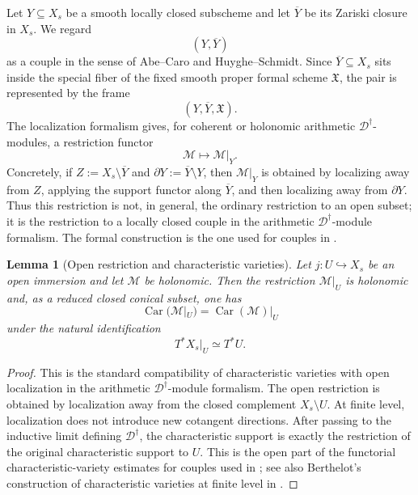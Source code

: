 \documentclass[11pt]{amsart}
\theoremstyle{plain}
\newtheorem{lemma}{Lemma}[section]
\theoremstyle{definition}
\theoremstyle{remark}
\newcommand{\Car}{\operatorname{Car}}
\begin{document}
Let \(Y\subseteq X_s\) be a smooth locally closed subscheme and let
\(\overline Y\) be its Zariski closure in \(X_s\). We regard
\[
  (Y,\overline Y)
\]
as a couple in the sense of Abe--Caro and Huyghe--Schmidt. Since
\(\overline Y\subseteq X_s\) sits inside the special fiber of the fixed smooth
proper formal scheme \(\mathfrak X\), the pair is represented by the frame
\[
  (Y,\overline Y,\mathfrak X).
\]
The localization formalism gives, for coherent or holonomic arithmetic
\(\mathscr D^\dagger\)-modules, a restriction functor
\[
  \mathcal M\longmapsto \mathcal M|_Y.
\]
Concretely, if \(Z:=X_s\setminus\overline Y\) and
\(\partial Y:=\overline Y\setminus Y\), then \(\mathcal M|_Y\) is obtained by
localizing away from \(Z\), applying the support functor along \(\overline Y\),
and then localizing away from \(\partial Y\). Thus this restriction is not, in
general, the ordinary restriction to an open subset; it is the restriction to a
locally closed couple in the arithmetic \(\mathscr D^\dagger\)-module
formalism. The formal construction is the one used for couples in
\cite[\S2.1, Lemmas 2.1.1--2.1.2]{HuygheSchmidtIntermediate}.


\begin{lemma}[Open restriction and characteristic varieties]
\label{lem:open-restriction-characteristic}
Let \(j:U\hookrightarrow X_s\) be an open immersion and let \(\mathcal M\) be
holonomic. Then the restriction \(\mathcal M|_U\) is holonomic and, as a
reduced closed conical subset, one has
\[
  \Car(\mathcal M|_U)=\Car(\mathcal M)|_U
\]
under the natural identification
\[
  T^*X_s|_U\simeq T^*U.
\]
\end{lemma}

\begin{proof}
This is the standard compatibility of characteristic varieties with open
localization in the arithmetic \(\mathscr D^\dagger\)-module formalism.  The
open restriction is obtained by localization away from the closed complement
\(X_s\setminus U\). At finite level, localization does not introduce new
cotangent directions. After passing to the inductive limit defining
\(\mathscr D^\dagger\), the characteristic support is exactly the restriction
of the original characteristic support to \(U\). This is the open part of the
functorial characteristic-variety estimates for couples used in
\cite[\S2.1, Lemmas 2.1.1--2.1.2]{HuygheSchmidtIntermediate}; see also
Berthelot's construction of characteristic varieties at finite level in
\cite[5.3.2--5.3.4]{BerthelotIntro}.
\end{proof}
\end{document}

